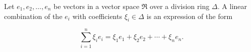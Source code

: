 Let $e_1, e_2, \ldots, e_n$ be vectors in a vector space $\mathfrak{R}$ over a division ring $\Delta$. A linear combination of the $e_i$ with coefficients $\xi_i \in \Delta$ is an expression of the form

$$\sum_{i=1}^{n} \xi_i e_i = \xi_1 e_1 + \xi_2 e_2 + \cdots + \xi_n e_n.$$
